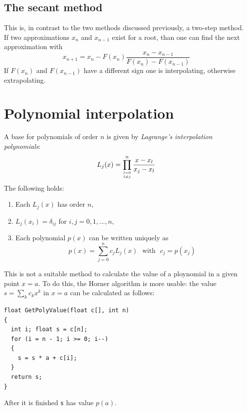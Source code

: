 \documentclass[twoside]{report}
\begin{document}
\subsection{The secant method}
This is, in contrast to the two methods discussed previously, a two-step
method. If two approximations $x_n$ and $x_{n-1}$ exist for a root, than
one can find the next approximation with
\[
x_{n+1}=x_n-F(x_n)\frac{x_n-x_{n-1}}{F(x_n)-F(x_{n-1})}
\]
If $F(x_n)$ and $F(x_{n-1})$ have a different sign one is interpolating,
otherwise extrapolating.

\section{Polynomial interpolation}
A base for polynomials of order $n$ is given by {\it Lagrange's interpolation
polynomials}:
\[
L_j(x)=\prod_{{l=0}\atop{l\neq j}}^n\frac{x-x_l}{x_j-x_l}
\]
The following holds:
\begin{enumerate}
\item Each $L_j(x)$ has order $n$,
\item $L_j(x_i)=\delta_{ij}$ for $i,j=0,1,...,n$,
\item Each polynomial $p(x)$ can be written uniquely as
\[
p(x)=\sum_{j=0}^n c_jL_j(x)~~~\mbox{with}~~~c_j=p(x_j)
\]
\end{enumerate}
This is not a suitable method to calculate the value of a ploynomial in a
given point $x=a$. To do this, the Horner algorithm is more usable: the
value $s=\sum_k c_kx^k$ in $x=a$ can be calculated as follows:
\begin{verbatim}
float GetPolyValue(float c[], int n)
{
  int i; float s = c[n];
  for (i = n - 1; i >= 0; i--)
  {
    s = s * a + c[i];
  }
  return s;
}
\end{verbatim}
After it is finished {\tt s} has value $p(a)$.
\end{document}
